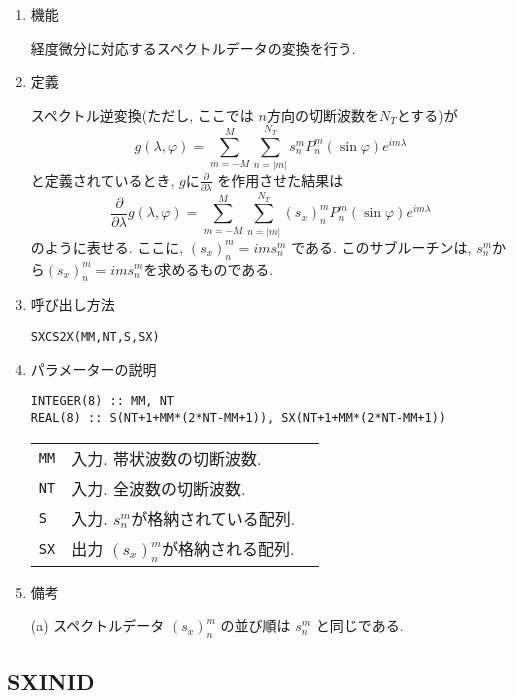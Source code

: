 \documentclass[a4j]{jsarticle}
\begin{document}
\begin{enumerate}

\item 機能 

経度微分に対応するスペクトルデータの変換を行う.

\item 定義

スペクトル逆変換(ただし, ここでは $n$方向の切断波数を$N_T$とする)が
\begin{equation}
g(\lambda,\varphi)=\sum^M_{m=-M}\sum^{N_T}_{n=|m|}
s^m_nP^m_n(\sin\varphi)e^{im\lambda}
\end{equation}
と定義されているとき, $g$に$\frac{\partial}{\partial\lambda}$
を作用させた結果は
\begin{equation}
\frac{\partial}{\partial\lambda}
g(\lambda,\varphi)=\sum^M_{m=-M}\sum^{N_T}_{n=|m|}
(s_x)^m_nP^m_n(\sin\varphi)e^{im\lambda}
\end{equation}
のように表せる. ここに, $(s_x)^m_n=ims^m_n$ である.
このサブルーチンは, $s^m_n$から$(s_x)^m_n=ims^m_n$を求めるものである.

\item 呼び出し方法 

\texttt{SXCS2X(MM,NT,S,SX)}
  
\item パラメーターの説明

\begin{verbatim}
INTEGER(8) :: MM, NT
REAL(8) :: S(NT+1+MM*(2*NT-MM+1)), SX(NT+1+MM*(2*NT-MM+1))
\end{verbatim}

\begin{tabular}{lll}
\texttt{MM} & 入力. 帯状波数の切断波数.\\  
\texttt{NT} & 入力. 全波数の切断波数.\\
\texttt{S} & 入力. $s^m_n$が格納されている配列.\\
\texttt{SX} & 出力 $(s_x)^m_n$が格納される配列.\\
\end{tabular}

\item 備考

(a) スペクトルデータ $(s_x)^m_n$ の並び順は $s^m_n$ と同じである.
    
\end{enumerate}


\subsection{SXINID}
\end{document}
